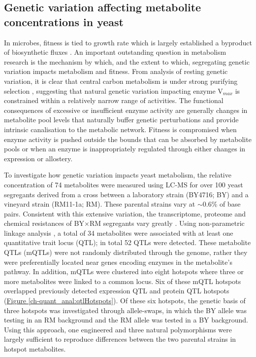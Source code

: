 \subsection{Genetic variation affecting metabolite concentrations in yeast \label{ch:quant_analysis:mQTL}}

In microbes, fitness is tied to growth rate which is largely established a byproduct of biosynthetic fluxes \cite{Dykhuizen:1987uq, Edwards:2001hj}. An important outstanding question in metabolism research is the mechanism by which, and the extent to which, segregating genetic variation impacts metabolism and fitness.  From analysis of resting genetic variation, it is clear that central carbon metabolism is under strong purifying selection \cite{Greenberg:2008uy}, suggesting that natural genetic variation impacting enzyme V$_{max}$ is constrained within a relatively narrow range of activities. The functional consequences of excessive or insufficient enzyme activity are generally changes in metabolite pool levels that naturally buffer genetic perturbations \cite{Fendt:2010gr} and provide intrinsic canalisation to the metabolic network. Fitness is compromised when enzyme activity is pushed outside the bounds that can be absorbed by metabolite pools or when an enzyme is inappropriately regulated through either changes in expression or allostery. 

To investigate how genetic variation impacts yeast metabolism, the relative concentration of 74 metabolites were measured using LC-MS for over 100 yeast segregants derived from a cross between a laboratory strain (BY4716; BY) and a vineyard strain (RM11-1a; RM). These parental strains vary at $\sim$0.6\% of base pairs. Consistent with this extensive variation, the transcriptome, proteome and chemical resistances of BY$\times$RM segregants vary greatly \cite{Brem:2005gh, Foss:2007ej, Bloom:2013bq}. Using non-parametric linkage analysis \cite{Broman:2003wq}, a total of 34 metabolites were associated with at least one quantitative trait locus (QTL); in total 52 QTLs were detected.  These metabolite QTLs (mQTLs) were not randomly distributed through the genome, rather they were preferentially located near genes encoding enzymes in the metabolite's pathway. In addition, mQTLs were clustered into eight hotspots where three or more metabolites were linked to a common locus. Six of these mQTL hotspots overlapped previously detected expression QTL and protein QTL hotspots (\hyperref[ch-quant_anal:qtlHotspots]{Figure \ref{ch-quant_anal:qtlHotspots}}). Of these six hotspots, the genetic basis of three hotspots was investigated through allele-swaps, in which the BY allele was testing in an RM background and the RM allele was tested in a BY background. Using this approach, one engineered and three natural polymorphisms were largely sufficient to reproduce differences between the two parental strains in hotspot metabolites. 

